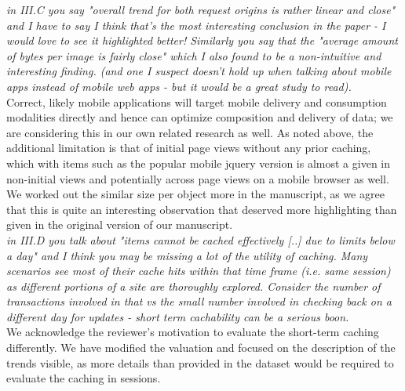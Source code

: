 \documentclass[11pt, draftclsnofoot, onecolumn]{IEEEtran}
\begin{document}
{{\noindent \textit{in III.C you say "overall trend for both request origins is rather linear and close" and I have to say I think that's the most interesting conclusion in the paper - I would love to see it highlighted better! Similarly you say that the "average amount of bytes per image is fairly close" which I also found to be a non-intuitive and interesting finding. (and one I suspect doesn't hold up when talking about mobile apps instead of mobile web apps - but it would be a great study to read).}\\
Correct, likely mobile applications will target mobile delivery and consumption modalities directly and hence can optimize composition and delivery of data; we are considering this in our own related research as well. As noted above, the additional limitation is that of initial page views without any prior caching, which with items such as the popular mobile jquery version is almost a given in non-initial views and potentially across page views on a mobile browser as well.
We worked out the similar size per object more in the manuscript, as we agree that this is quite an interesting observation that deserved more highlighting than given in the original version of our manuscript.\\


\noindent \textit{in III.D you talk about "items cannot be cached effectively [..] due to limits below a day" and I think you may be missing a lot of the utility of caching. Many scenarios see most of their cache hits within that time frame (i.e. same session) as different portions of a site are thoroughly explored. Consider the number of transactions involved in that vs the small number involved in checking back on a different day for updates - short term cachability can be a serious boon.}\\
We acknowledge the reviewer's motivation to evaluate the short-term caching differently. We have modified the valuation and focused on the description of the trends visible, as more details than provided in the dataset would be required to evaluate the caching in sessions.\\


}}
\end{document}
